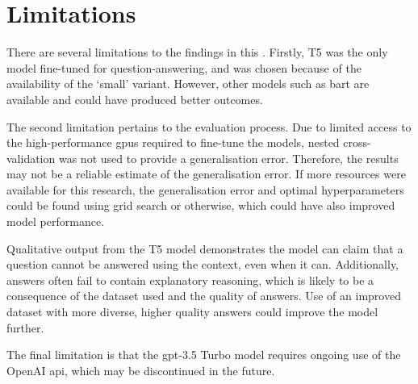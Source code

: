 \section{Limitations}
There are several limitations to the findings in this \papertype. Firstly, T5 was the only model fine-tuned for question-answering, and was chosen because of the availability of the `small' variant. However, other models such as \acrshort{bart} are available and could have produced better outcomes.

The second limitation pertains to the evaluation process. Due to limited access to the high-performance \acrshort{gpu}s required to fine-tune the models, nested cross-validation was not used to provide a generalisation error. Therefore, the results may not be a reliable estimate of the generalisation error. If more resources were available for this research, the generalisation error and optimal hyperparameters could be found using grid search or otherwise, which could have also improved model performance.

Qualitative output from the T5 model demonstrates the model can claim that a question cannot be answered using the context, even when it can. Additionally, answers often fail to contain explanatory reasoning, which is likely to be a consequence of the dataset used and the quality of answers. Use of an improved dataset with more diverse, higher quality answers could improve the model further. 

The final limitation is that the \acrshort{gpt}-3.5 Turbo model requires ongoing use of the OpenAI \acrshort{api}, which may be discontinued in the future.